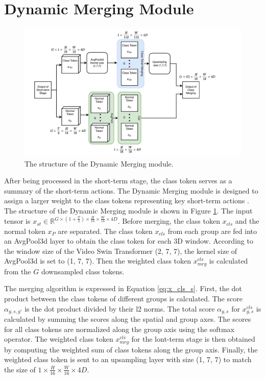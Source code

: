 \section{Dynamic Merging Module}
\label{sec:Dynamic Merging Module}
\begin{figure}[b]
    \centering
    \includegraphics[width=\textwidth]{graphics/dm.pdf}
    \caption{The structure of the Dynamic Merging module.}
    \label{fig:dynamic_merging}
\end{figure}
After being processed in the short-term stage, the class token serves as a summary of the short-term actions. The Dynamic Merging module is designed to assign a larger weight to the class tokens representing key short-term actions \cite{pan_egovit_2023}. The structure of the Dynamic Merging module is shown in Figure \ref{fig:dynamic_merging}. The input tensor is $x_{st} \in \mathbb{R}^{G \times (1+\frac{T}{2}) \times \frac{H}{16} \times \frac{W}{16} \times 4D}$. Before merging, the class token $x_{cls}$ and the normal token $x_{P}$ are separated. The class token $x_{cls}$ from each group are fed into an AvgPool3d layer to obtain the class token for each 3D window. According to the window size of the Video Swin Transformer (2, 7, 7), the kernel size of AvgPool3d is set to (1, 7, 7). Then the weighted class token $x^{cls}_{mrg}$ is calculated from the $G$ downsampled class tokens.

The merging algorithm is expressed in Equation \ref{eq:x_cls_s}. First, the dot product between the class tokens of different groups is calculated. The score $\alpha_{g,s,g'}$ is the dot product divided by their l2 norms. The total score $\alpha_{g,s}$ for $x^{cls}_{g,s}$ is calculated by summing the scores along the spatial and group axes. The scores for all class tokens are normalized along the group axis using the softmax operator. The weighted class token $x^{cls}_{mrg}$ for the lont-term stage is then obtained by computing the weighted sum of class tokens along the group axis. Finally, the weighted class token is sent to an upsampling layer with size (1, 7, 7) to match the size of $1 \times \frac{H}{16} \times \frac{W}{16} \times 4D$.

